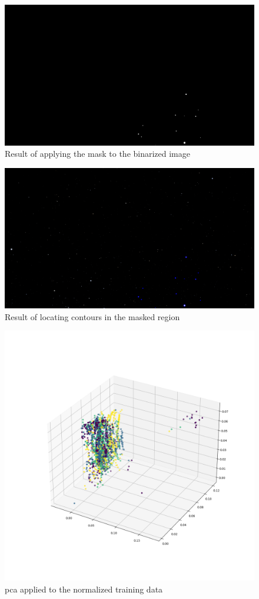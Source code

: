 \documentclass[10pt,twocolumn,letterpaper]{article}
\begin{document}
\begin{figure}[H]
  \centering
   \includegraphics[width=0.9\linewidth]{masked}
   \caption{Result of applying the mask to the binarized image}
   \label{fig:star_masked}
\end{figure}

\begin{figure}[H]
  \centering
   \includegraphics[width=0.9\linewidth]{local_contours}
   \caption{Result of locating contours in the masked region}
   \label{fig:star_local_contours}
\end{figure}

\begin{figure}[H]
  \centering
   \includegraphics[width=0.9\linewidth, trim={14em, 12em, 9em, 15em}, clip]{pca}
   \caption{\acrshort{pca} applied to the normalized training data}
   \label{fig:pca}
\end{figure}
\end{document}
